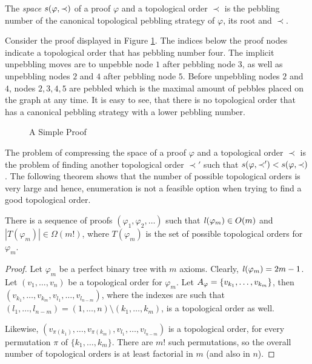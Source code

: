 \begin{definition}
\label{def:space measure}
The \emph{space} $s(\varphi,\prec)$ 
of a proof $\varphi$ and a topological order $\prec$ is the pebbling number of the canonical topological pebbling strategy of $\varphi$, its root and $\prec$.
\end{definition}

\begin{example}

Consider the proof displayed in Figure \ref{fig:spaceproof}.
The indices below the proof nodes indicate a topological order that has pebbling number four.
The implicit unpebbling moves are to unpebble node $1$ after pebbling node $3$, as well as unpebbling nodes $2$ and $4$ after pebbling node $5$.
Before unpebbling nodes $2$ and $4$, nodes $2,3,4,5$ are pebbled which is the maximal amount of pebbles placed on the graph at any time.
It is easy to see, that there is no topological order that has a canonical pebbling strategy with a lower pebbling number.

\begin{figure}[!h]

\caption{A Simple Proof}
\label{fig:spaceproof}
\end{figure}

\end{example}

The problem of compressing the space of a proof $\varphi$ and a topological order $\prec$ is the problem of finding another topological order $\prec'$ such that $s(\varphi,\prec') < s(\varphi,\prec)$. The following theorem shows that the number of possible topological orders is very large and hence, enumeration is not a feasible option when trying to find a good topological order.

\begin{theorem}
\label{theorem:enumeration}
There is a sequence of proofs $(\varphi_1,\varphi_2,\ldots)$ such that $\mathit{l}(\varphi_m) \in O(m)$ and $|T(\varphi_m)| \in \Omega(m!)$, where $T(\varphi_m)$ is the set of possible topological orders for $\varphi_m$.
\end{theorem}
\begin{proof}
Let $\varphi_m$ be a perfect binary tree with $m$ axioms. Clearly, $\mathit{l}(\varphi_m) = 2m-1$.
Let $(v_1,\ldots,v_n)$ be a topological order for $\varphi_m$. 
Let $A_{\varphi} = \{v_{k_1},\ldots,v_{k_m}\}$, then $(v_{k_1},\ldots,v_{k_m},v_{l_1},\ldots,v_{l_{n-m}})$, 
where the indexes are such that $(l_1,\ldots,l_{n-m}) = (1,\ldots,n) \setminus (k_1,\ldots,k_m)$, is a topological order as well. 

Likewise, $(v_{\pi({k_1})},\ldots,v_{\pi({k_m})},v_{l_1},\ldots,v_{l_{n-m}})$ is a topological order, for every permutation $\pi$ of $\{k_1,\ldots,k_m\}$. There are $m!$ such permutations, so the overall number of topological orders is at least factorial in $m$ (and also in $n$).
\end{proof}

